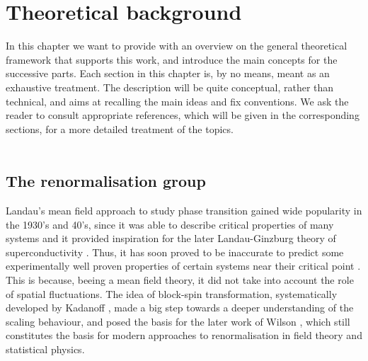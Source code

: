 \chapter{Theoretical background}
\label{chap:background}
In this chapter we want to provide with an overview on the general theoretical framework that supports this work, and introduce the main concepts for the successive parts. Each section in this chapter is, by no means, meant as an exhaustive treatment. The description will be quite conceptual, rather than technical, and aims at recalling the main ideas and fix conventions. We ask the reader to consult appropriate references,  which will be given in the corresponding sections, for a more detailed treatment of the topics. \\~\\

\section{The renormalisation group}
Landau's mean field approach to study phase transition \cite{Landau:1937obd} gained wide popularity in the 1930's and 40's, since it was able to describe critical properties of many systems and it provided inspiration for the later Landau-Ginzburg theory of superconductivity \cite{ginzburg}. Thus, it has soon proved to be inaccurate to predict some experimentally well proven properties of certain systems near their critical point \cite{Cao:1999pw}. This is because, beeing a mean field theory, it did not take into account the role of spatial fluctuations.
The idea of block-spin transformation, systematically developed by Kadanoff \cite{PhysicsPhysiqueFizika_2_263}, made a big step towards a deeper understanding of the scaling behaviour, and posed the basis for the later work of Wilson \cite{WilsonRG1,WilsonRG2,WilsonFisher}, which still constitutes the basis for modern approaches to renormalisation in field theory and statistical physics.\\~\\

